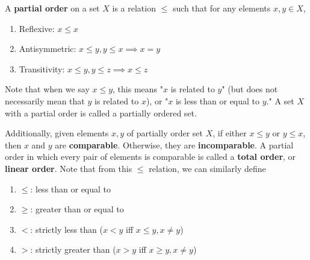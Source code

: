 \documentclass{article}
\begin{document}
      \begin{definition}
        A \textbf{partial order} on a set $X$ is a relation $\leq$ such that for any elements $x, y \in X$, 
        \begin{enumerate}
          \item Reflexive: $x \leq x$ 
          \item Antisymmetric: $x \leq y, y \leq x \implies x = y$
          \item Transitivity: $x \leq y, y \leq z \implies x \leq z$
        \end{enumerate}
        Note that when we say $x \leq y$, this means "$x$ is related to $y$" (but does not necessarily mean that $y$ is related to $x$), or "$x$ is less than or equal to $y$." A set $X$ with a partial order is called a partially ordered set. 

        Additionally, given elements $x, y$ of partially order set $X$, if either $x \leq y$ or $y \leq x$, then $x$ and $y$ are \textbf{comparable}. Otherwise, they are \textbf{incomparable}. A partial order in which every pair of elements is comparable is called a \textbf{total order}, or \textbf{linear order}. Note that from this $\leq$ relation, we can similarly define 
        \begin{enumerate}
          \item $\leq$: less than or equal to 
          \item $\geq$: greater than or equal to 
          \item $<$: strictly less than ($x < y$ iff $x\leq y, x \neq y$)
          \item $>$: strictly greater than ($x > y$ iff $x \geq y, x \neq y$)
        \end{enumerate}
      \end{definition} 
\end{document}

